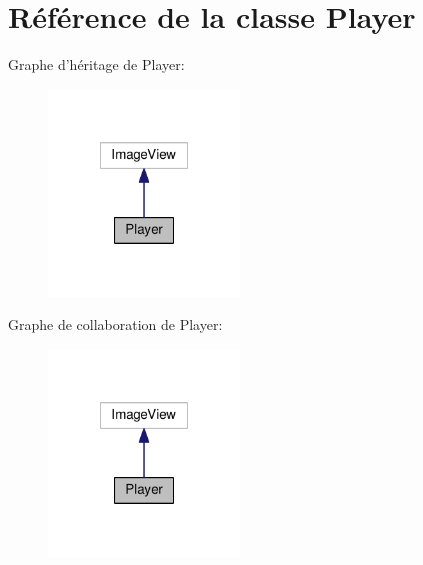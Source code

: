 \hypertarget{class_player}{\section{Référence de la classe Player}
\label{class_player}
}


Graphe d'héritage de Player\-:
\nopagebreak
\begin{figure}[H]
\begin{center}
\leavevmode
\includegraphics[width=144pt]{class_player__inherit__graph}
\end{center}
\end{figure}


Graphe de collaboration de Player\-:
\nopagebreak
\begin{figure}[H]
\begin{center}
\leavevmode
\includegraphics[width=144pt]{class_player__coll__graph}
\end{center}
\end{figure}
